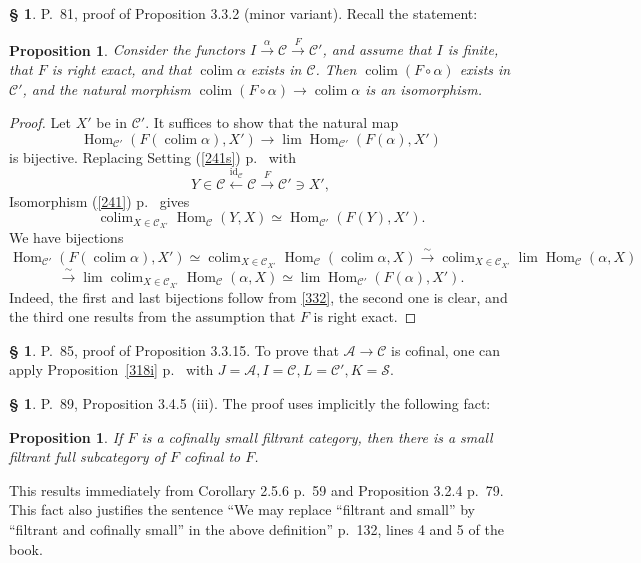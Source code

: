 \documentclass[12pt]{article}
\newtheorem{prop}[thm]{Proposition}
\theoremstyle{remark}
\theoremstyle{definition}
\newtheorem{s}[thm]{\S}
\newcommand{\cc}{\mathcal}
\newcommand{\A}{\mathcal A}
\newcommand{\C}{\mathcal C}
\newcommand{\xr}{\xrightarrow}
\newcommand{\mv}{ (minor variant)}
\DeclareMathOperator*{\co}{colim}
\DeclareMathOperator{\id}{id}
\DeclareMathOperator{\Hom}{Hom}%
\begin{document}
\begin{s} P.~81, proof of Proposition 3.3.2\mv. Recall the statement:
%
\begin{prop} 
%
Consider the functors $I\xrightarrow\alpha\C\xrightarrow F\C'$, and assume that $I$ is finite, that $F$ is right exact, and that $\co\alpha$ exists in $\C$. Then $\co(F\circ\alpha)$ exists in $\C'$, and the natural morphism $\co(F\circ\alpha)\to\co\alpha$ is an isomorphism. 
%
\end{prop} 
%
\begin{proof}
Let $X'$ be in $\C'$. It suffices to show that the natural map 
$$
\Hom_{\C'}(F(\co\alpha),X')\to\lim\Hom_{\C'}(F(\alpha),X')
$$ 
%
is bijective. Replacing Setting (\ref{241s}) p.~\pageref{241s} with 
$$
Y\in\C\xleftarrow{\id_\C}\C\xrightarrow{F}\C'\ni X', 
$$ 
Isomorphism (\ref{241}) p.~\pageref{241} gives 
%
\begin{equation}\label{332} 
\co_{X\in\C_{X'}}\Hom_\C(Y,X)\simeq\Hom_{\C'}(F(Y),X').
\end{equation} 
%
We have bijections 
$$ 
\Hom_{\C'}(F(\co\alpha),X')\simeq\co_{X\in\C_{X'}}\Hom_\C(\co\alpha,X)\xr\sim\co_{X\in\C_{X'}}\lim\Hom_\C(\alpha,X) 
$$ 
$$
\xr\sim\lim\co_{X\in\C_{X'}}\Hom_\C(\alpha,X)\simeq\lim\Hom_{\C'}(F(\alpha),X'). 
$$ 
Indeed, the first and last bijections follow from \eqref{332}, the second one is clear, and the third one results from the assumption that $F$ is right exact.
\end{proof}
\end{s}
%
%
\begin{s}\label{3315}
P.~85, proof of Proposition 3.3.15. To prove that $\A\to\C$ is cofinal, one can apply Proposition~\ref{318i} p.~\pageref{318i} with $J=\A,I=\C,L=\C',K=\cc S$. 
\end{s}
%
%
\begin{s} 
P.~89, Proposition 3.4.5 (iii). The proof uses implicitly the following fact: 

\begin{prop}\label{355} 
If $F$ is a cofinally small filtrant category, then there is a small {\em filtrant} full subcategory of $F$ cofinal to $F$. 
\end{prop}

This results immediately from Corollary 2.5.6 p.~59 and Proposition 3.2.4 p.~79. This fact also justifies the sentence ``We may replace ``filtrant and small'' by ``filtrant and cofinally small'' in the above definition'' p.~132, lines 4 and 5 of the book.
\end{s}
%
%
\end{document}

